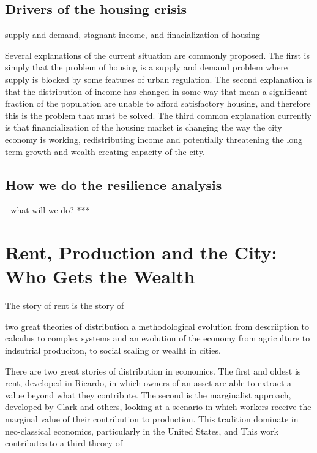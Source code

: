 \subsection{Drivers of the housing crisis}
supply and demand, stagnant income, and finacialization of housing

Several explanations of the current situation are commonly proposed. The first is simply that the problem of housing is a supply and demand problem where supply is blocked by some features of urban regulation. The second explanation is that the distribution of income has changed in some way that mean a significant fraction of the population are unable to afford satisfactory housing, and therefore this is the problem that must be solved.  The third common explanation currently is that financialization of the housing market  is changing the way the city economy is working, redistributing income and potentially threatening the long term growth and wealth creating capacity of the city.


\subsection{How we do the resilience analysis}

- what will we do? *** 



\section{Rent, Production and the City: Who Gets the Wealth}



The story of rent is the story of 

two great theories of distribution
a methodological evolution from descriiption to calculus to complex systems and an evolution of the economy 
from agriculture to indsutrial produciton, to social scaling or wealht in cities. 



There are two great stories of distribution in economics. The first and oldest is rent, %
developed in Ricardo, in which owners of an asset are able to extract a value beyond what they contribute. 
The second is the marginalist approach, developed by Clark and others, looking at a scenario in which workers receive the marginal value of their contribution to production. This tradition dominate in neo-classical economics, particularly in the United States, and %
This work contributes to a third theory of 

